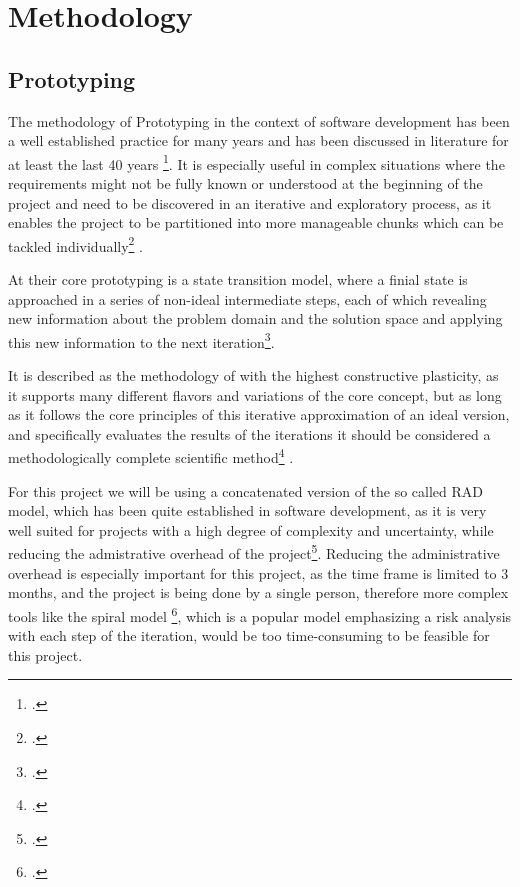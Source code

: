 \chapter{Methodology}
\label{methodology}

\section{Prototyping}


The methodology of Prototyping in the context of software development has been a well established practice for many years and
has been discussed in literature for at least the last 40 years \footcite{gomaaImpactRapidPrototyping1983}.
It is especially useful in complex situations where the requirements might not be fully known or understood at the beginning of the project
and need to be discovered in an iterative and exploratory process, 
as it enables the project to be partitioned into more manageable chunks which can be tackled individually\footcite{naumannPrototypingNewParadigm1982} .

At their core prototyping is a state transition model, where a finial state is approached in a series of non-ideal intermediate steps,
each of which revealing new information about the problem domain and the solution space and applying this new information to the next iteration\footcite{kraushaarPrototypingMethodApplications1985}.

It is described as the methodology of with the highest constructive plasticity, as it supports many different flavors and variations of the core concept,
but as long as it follows the core principles of this iterative approximation of an ideal version, and specifically evaluates the results of the iterations it should be considered a methodologically complete scientific method\footcite{wildeMethodenspektrumWirtschaftsinformatikUeberblick} .

For this project we will be using a concatenated version of the so called \ac{RAD} model, which has been quite established in software development, as it is very well suited for projects with a high degree of complexity and uncertainty, while reducing the admistrative overhead of the project\footcite{martinRapidApplicationDevelopment1991}.
Reducing the administrative overhead is especially important for this project, as the time frame is limited to 3 months, and the project is being done by a single person, 
therefore more complex tools like the spiral model \footcite{boehmSpiralModelSoftware1988}, which is a popular model emphasizing a risk analysis with each step of the iteration, 
would be too time-consuming to be feasible for this project.


